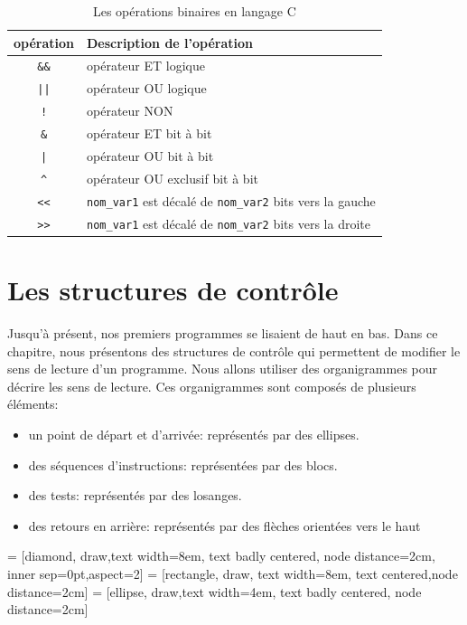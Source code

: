 \documentclass[a4paper,11pt]{book}
\theoremstyle{definition}
\begin{document}
\begin{table}[!t]
\centering
\begin{tabular}{cp{10cm}}
  \hline
  \textbf{opération} & Description de l'opération\\
  \hline
  \texttt{\&\&} & opérateur ET logique\\
  \texttt{||}\index{||} & opérateur OU logique\\
  \texttt{!}\index{!} & opérateur NON\\
  \texttt{\&}\index{\&} & opérateur ET bit à bit \\
  \texttt{|}\index{|} & opérateur OU bit à bit\\
  \texttt{\^}\index{\^} & opérateur OU exclusif bit à bit\\
  \texttt{<}\texttt{<} & \texttt{nom\_var1} est décalé de \texttt{nom\_var2} bits vers la gauche \\
  \texttt{>}\texttt{>}& \texttt{nom\_var1} est décalé de \texttt{nom\_var2} bits vers la droite \\

  \hline
\end{tabular}
\caption{Les opérations binaires en langage C\label{op_bin}}
\end{table}


\chapter{Les structures de contrôle}\label{instruction}

Jusqu'à présent, nos premiers programmes se lisaient de haut en bas. Dans ce chapitre, nous présentons des structures de contrôle qui permettent de modifier le sens de lecture d'un programme. Nous allons utiliser des organigrammes pour décrire les sens de lecture. Ces organigrammes sont composés de plusieurs éléments:
\begin{itemize}
\item un point de départ et d'arrivée: représentés par des ellipses.
\item des séquences d'instructions: représentées par des blocs.
\item des tests: représentés par des losanges.
\item des retours en arrière: représentés par des flèches orientées vers le haut
\end{itemize}
 = [diamond, draw,text width=8em, text badly centered, node distance=2cm, inner sep=0pt,aspect=2]
 = [rectangle, draw, text width=8em, text centered,node distance=2cm]
 = [ellipse, draw,text width=4em, text badly centered, node distance=2cm]
\end{document}
